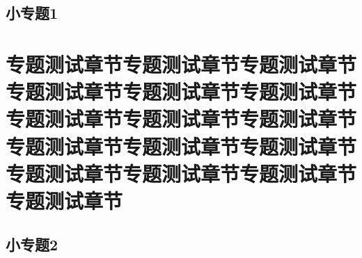 \documentclass[color=green]{textbook-cn}%
\begin{document}
\begin{Topic}

\section{小专题1}


\Example{\zhlipsum[1]}

\subsection{}
\subsection{  }



\begin{Exercise}
	\lipsum[2]
\end{Exercise}

\begin{Thinking}
	\lipsum[2]
\end{Thinking}


\begin{Improve}
	\lipsum[2]
\end{Improve}




\makeatletter

\makeatother


\chapter{专题测试章节专题测试章节专题测试章节专题测试章节专题测试章节专题测试章节专题测试章节专题测试章节专题测试章节专题测试章节专题测试章节专题测试章节专题测试章节专题测试章节专题测试章节专题测试章节}

\zhlipsum


\section{小专题2}


\Example{\zhlipsum[1]}


\Example{\zhlipsum[2]}

	
\end{Topic}
\end{document}
